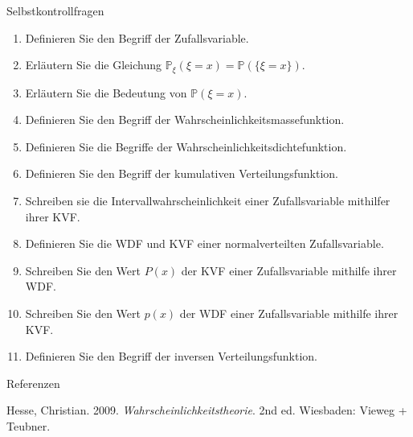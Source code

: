 \documentclass[
  8pt,
  ignorenonframetext,
]{beamer}
\newlength{\cslhangindent}
\newlength{\cslentryspacingunit} %
\newenvironment{CSLReferences}[2] %
 {%
  \setlength{\parindent}{0pt}
  \ifodd #1
  \let\oldpar\par
  \def\par{\hangindent=\cslhangindent\oldpar}
  \fi
  \setlength{\parskip}{#2\cslentryspacingunit}
 }%
 {}
\begin{document}
\begin{frame}{Selbstkontrollfragen}
\protect\hypertarget{selbstkontrollfragen}{}
\small
{}
\begin{enumerate}
\item Definieren Sie den Begriff der Zufallsvariable.
\item Erläutern Sie die Gleichung $\mathbb{P}_\xi(\xi = x) = \mathbb{P}(\{\xi = x\})$.
\item Erläutern Sie die Bedeutung von $\mathbb{P}(\xi = x)$.
\item Definieren Sie den Begriff der Wahrscheinlichkeitsmassefunktion.
\item Definieren Sie die Begriffe der Wahrscheinlichkeitsdichtefunktion.
\item Definieren Sie den Begriff der kumulativen Verteilungsfunktion.
\item Schreiben sie die Intervallwahrscheinlichkeit einer Zufallsvariable mithilfer ihrer KVF. 
\item Definieren Sie die WDF und KVF einer normalverteilten Zufallsvariable.
\item Schreiben Sie den Wert $P(x)$ der KVF einer Zufallsvariable mithilfe ihrer WDF.
\item Schreiben Sie den Wert $p(x)$ der WDF einer Zufallsvariable mithilfe ihrer KVF.
\item Definieren Sie den Begriff der inversen Verteilungsfunktion.
\end{enumerate}
\end{frame}

\begin{frame}{Referenzen}
\protect\hypertarget{referenzen}{}
\footnotesize

\hypertarget{refs}{}
\begin{CSLReferences}{1}{0}
\leavevmode{}%
Hesse, Christian. 2009. \emph{Wahrscheinlichkeitstheorie}. 2nd ed.
Wiesbaden: Vieweg + Teubner.

\end{CSLReferences}
\end{frame}
\end{document}
